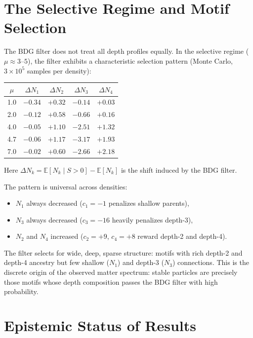 \documentclass[11pt]{article}
\begin{document}
\section{The Selective Regime and Motif Selection}
\label{sec:selective}

The BDG filter does not treat all depth profiles equally. In the selective regime ($\mu\approx 3$--$5$), the filter exhibits a characteristic selection pattern (Monte Carlo, $3\times 10^5$ samples per density):

\begin{center}
\begin{tabular}{ccccc}
\toprule
$\mu$ & $\Delta N_1$ & $\Delta N_2$ & $\Delta N_3$ & $\Delta N_4$ \\
\midrule
1.0 & $-0.34$ & $+0.32$ & $-0.14$ & $+0.03$ \\
2.0 & $-0.12$ & $+0.58$ & $-0.66$ & $+0.16$ \\
4.0 & $-0.05$ & $+1.10$ & $-2.51$ & $+1.32$ \\
4.7 & $-0.06$ & $+1.17$ & $-3.17$ & $+1.93$ \\
7.0 & $-0.02$ & $+0.60$ & $-2.66$ & $+2.18$ \\
\bottomrule
\end{tabular}
\end{center}

Here $\Delta N_k=\mathbb{E}[N_k\mid S>0]-\mathbb{E}[N_k]$ is the shift induced by the BDG filter.

The pattern is universal across densities:
\begin{itemize}[nosep]
    \item $N_1$ always decreased ($c_1=-1$ penalizes shallow parents),
    \item $N_3$ always decreased ($c_3=-16$ heavily penalizes depth-3),
    \item $N_2$ and $N_4$ increased ($c_2=+9$, $c_4=+8$ reward depth-2 and depth-4).
\end{itemize}
The filter selects for wide, deep, sparse structure: motifs with rich depth-2 and depth-4 ancestry but few shallow ($N_1$) and depth-3 ($N_3$) connections. This is the discrete origin of the observed matter spectrum: stable particles are precisely those motifs whose depth composition passes the BDG filter with high probability.

\section{Epistemic Status of Results}
\label{sec:status}
\end{document}
